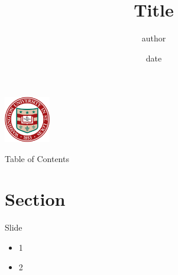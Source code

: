 \documentclass[11pt,aspectratio=1610]{beamer} %
\title[s1]{Title}
\author[a1]{author}
\institute[]{Washington University in St. Louis}
\date{date}
\begin{document}
\placelogofalse
\begin{frame}
  \titlepage
  \begin{center}
  \includegraphics[width=0.15\textwidth]{Images/washU (1).png}
  \end{center}
  \end{frame}
\placelogotrue
\begin{frame}{Table of Contents}	
	    \footnotesize
    \tableofcontents[hideallsubsections]
\end{frame}
\section{Section}
\begin{frame}{Slide}
    \begin{itemize}
        \item<1-> 1
        \item<2-> 2
    \end{itemize}
    
\end{frame}
\end{document}
